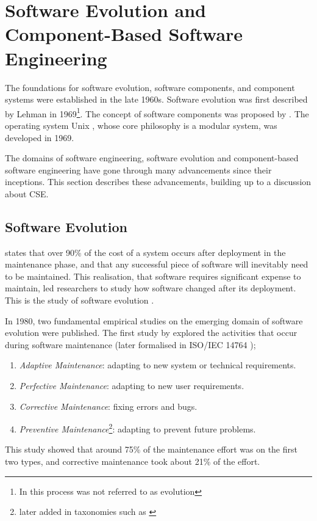 \section{Software Evolution and Component-Based Software Engineering}
\label{background.histories}
The foundations for software evolution, software components, and component systems were established in the late 1960s.
Software evolution was first described by Lehman in 1969\footnote{In \cite{Lehman1969} this process was not referred to as evolution}.
The concept of software components was proposed by \cite{McIlroy1969}.
The operating system Unix \citep{raymond2003art}, whose core philosophy is a modular system, was developed in 1969.

The domains of software engineering, software evolution and component-based software engineering have gone through many advancements since their inceptions.
This section describes these advancements, building up to a discussion about CSE.

\subsection{Software Evolution}
\cite{Brooks1975} states that over 90\% of the cost of a system occurs after deployment in the maintenance phase,
and that any successful piece of software will inevitably need to be maintained.
This realisation, that software requires significant expense to maintain, led researchers to study how software changed after its deployment.
This is the study of software evolution \citep{lehman1980}.

In 1980, two fundamental empirical studies on the emerging domain of software evolution were published.
The first study by \cite{Lientz1980} explored the activities that occur during software maintenance (later formalised in ISO/IEC 14764 \citep{IsoIec2006});
\begin{enumerate}
	\item \textit{Adaptive Maintenance}: adapting to new system or technical requirements.
	\item \textit{Perfective Maintenance}: adapting to new user requirements.
	\item \textit{Corrective Maintenance}: fixing errors and bugs.
	\item \textit{Preventive Maintenance}\footnote{later added in taxonomies such as \citep{iee1990ieee}}: adapting to prevent future problems.
\end{enumerate}

This study showed that around 75\% of the maintenance effort was on the first two types, and corrective maintenance took about 21\% of the effort.

